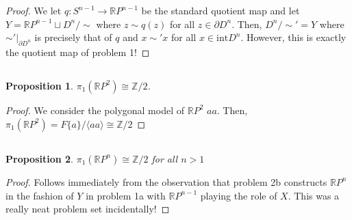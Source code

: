 \documentclass[english]{article}
\newcommand{\evat}[3]{\left. #1\right|_{#2}^{#3}}
\newcommand{\restr}[2]{\evat{#1}{#2}{}}
\newcommand{\RR}{\mathbb{R}}
\newcommand{\ZZ}{\mathbb{Z}}
\newcommand{\prt}[1]{\setcounter{subsection}{#1-1}\subsection{}}
\newtheorem*{proposition*}{Proposition}
\theoremstyle{remark}
\theoremstyle{definition}
\newcommand{\intr}{\mathrm{int}}
\newcommand{\bdy}{\partial}
\begin{document}
\begin{proof}
	We let $q:S^{n-1}\to \RR P^{n-1}$ be the standard quotient map and let $Y=\RR P^{n-1}\sqcup D^n/\sim$ where $z\sim q(z)$ for all $z\in \bdy D^n$. Then, $D^n/\sim'=Y$ where $\restr{\sim'}{\bdy D^n}$ is precisely that of $q$ and $x\sim' x$ for all $x\in \intr D^n$. However, this is exactly the quotient map of problem 1!
	\end{proof}
\prt{3}\begin{proposition*}
	$\pi_1(\RR P^2)\cong \ZZ/2$.
\end{proposition*}
\begin{proof}
	We consider the polygonal model of $\RR P^2$ $aa$. Then, $\pi_1(\RR P^2)=F\{a\}/\langle aa \rangle\cong \ZZ/2$
\end{proof}
\prt{4}\begin{proposition*}
	$\pi_1(\RR P^n)\cong \ZZ/2$ for all $n>1$
	\end{proposition*} 
\begin{proof}
	Follows immediately from the observation that problem 2b constructs $\RR P^n$ in the fashion of $Y$ in problem 1a with $\RR P^{n-1}$ playing the role of $X$. This was a really neat problem set incidentally!
\end{proof}
\end{document}
